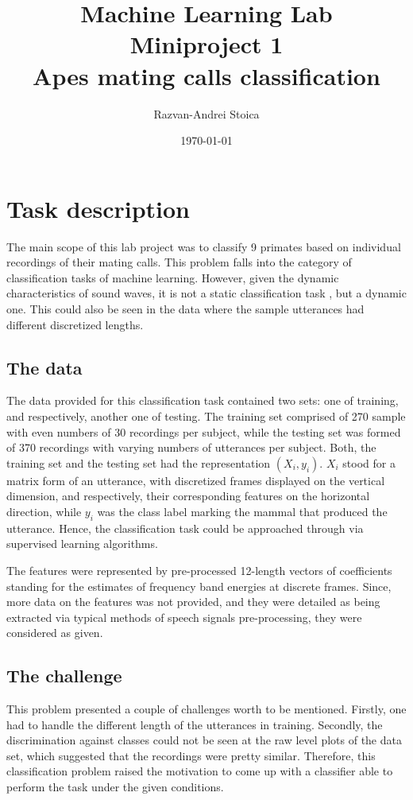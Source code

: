 \documentclass[a4paper,10pt]{article}
\title{\textbf{Machine Learning Lab} \\ \textbf{ Miniproject 1} \\ \textbf{Apes mating calls classification}}
\author{Razvan-Andrei Stoica}
\date{\today}
\begin{document}
\maketitle

\section{Task description}
The main scope of this lab project was to classify 9 primates based on individual recordings of their mating calls. This problem falls into the category of classification tasks of machine learning. However, given the dynamic characteristics of sound waves, it is not a static classification task , but a dynamic one.  This could also be seen in the data where the sample utterances had different discretized lengths. 

\subsection*{The data}
The data provided for this classification task contained two sets: one of training, and respectively, another one of testing. The training set comprised of 270 sample with even numbers of 30 recordings per subject, while the testing set was formed of 370 recordings with varying numbers of utterances per subject. Both, the training set and the testing set had the representation $(X_i,y_i)$. $X_i$ stood for a matrix form of an utterance, with discretized frames displayed on the vertical dimension, and respectively, their corresponding features on the horizontal direction, while $y_i$ was the class label marking the mammal that produced the utterance. Hence, the classification task could be approached through via supervised learning algorithms.

The features were represented by pre-processed 12-length vectors of coefficients standing for the estimates of frequency band energies at discrete frames. Since, more data on the features was not provided, and they were detailed as being extracted via typical methods of speech signals pre-processing, they were considered as given.

\subsection*{The challenge}
This problem presented a couple of challenges worth to be mentioned. Firstly, one had to handle the different length of the utterances in training. Secondly, the discrimination against classes could not be seen at the raw level plots of the data set, which suggested that the recordings were pretty similar. Therefore, this classification problem raised the motivation to come up with a classifier able to perform the task under the given conditions.  
\end{document}
